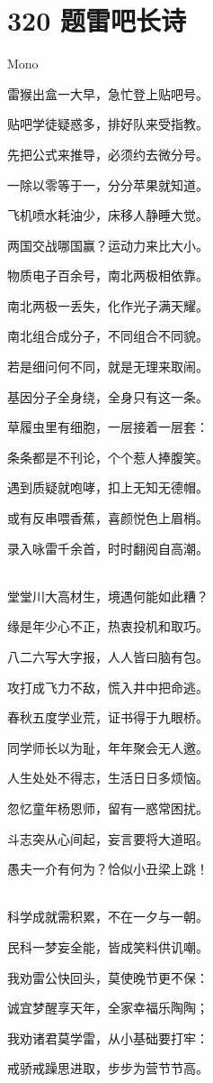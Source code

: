 \documentclass[UTF8,12pt,oneside]{ctexbook}
\def\pau#1{\begin{center} {#1} \end{center}} %
\def\poem#1#2{\section{#1}\pau{#2}} %
\begin{document}
        \poem{320 题雷吧长诗}{Mono}
        \begin{center}
            雷猴出盒一大早，急忙登上贴吧号。
            
            贴吧学徒疑惑多，排好队来受指教。
            
            先把公式来推导，必须约去微分号。
            
            一除以零等于一，分分苹果就知道。
            
            飞机喷水耗油少，床移人静睡大觉。
            
            两国交战哪国赢？运动力来比大小。
            
            物质电子百余号，南北两极相依靠。
            
            南北两极一丢失，化作光子满天耀。
            
            南北组合成分子，不同组合不同貌。
            
            若是细问何不同，就是无理来取闹。
            
            基因分子全身绕，全身只有这一条。
            
            草履虫里有细胞，一层接着一层套：
            
            条条都是不刊论，个个惹人捧腹笑。
            
            遇到质疑就咆哮，扣上无知无德帽。
            
            或有反串喂香蕉，喜颜悦色上眉梢。
            
            录入咏雷千余首，时时翻阅自高潮。

            ~\\
            堂堂川大高材生，境遇何能如此糟？
            
            缘是年少心不正，热衷投机和取巧。
            
            八二六写大字报，人人皆曰脑有包。
            
            攻打成飞力不敌，慌入井中把命逃。
            
            春秋五度学业荒，证书得于九眼桥。
            
            同学师长以为耻，年年聚会无人邀。
            
            人生处处不得志，生活日日多烦恼。
            
            忽忆童年杨恩师，留有一惑常困扰。
            
            斗志突从心间起，妄言要将大道昭。
            
            愚夫一介有何为？恰似小丑梁上跳！

            ~\\
            科学成就需积累，不在一夕与一朝。
            
            民科一梦妄全能，皆成笑料供讥嘲。
            
            我劝雷公快回头，莫使晚节更不保：
            
            诚宜梦醒享天年，全家幸福乐陶陶；
            
            我劝诸君莫学雷，从小基础要打牢：
            
            戒骄戒躁思进取，步步为营节节高。
        \end{center}
\end{document}
